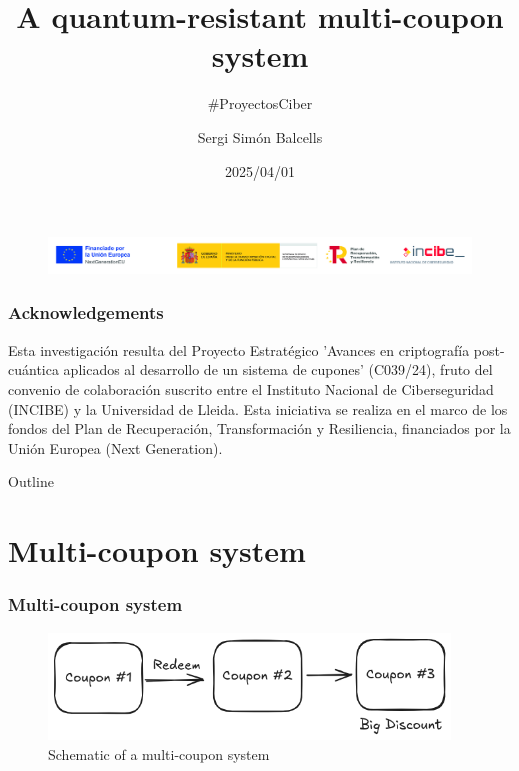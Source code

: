 \documentclass[presentation]{beamer}
\author{Sergi Simón Balcells}
\date{2025/04/01}
\title{A quantum-resistant multi-coupon system}
\subtitle{\#ProyectosCiber}
\newlength\beamerleftmargin
\begin{document}
\begin{frame}
  \titlepage
  \begin{figure}
    \hspace*{-\beamerleftmargin}%
    \includegraphics[width=\paperwidth]{incibe.jpg}
  \end{figure}
\end{frame}

\begin{frame}
  \frametitle{Acknowledgements}
  Esta investigación resulta del Proyecto Estratégico 'Avances
  en criptografía post-cuántica aplicados al desarrollo
  de un sistema de cupones' (C039/24), fruto del convenio
  de colaboración suscrito entre el Instituto Nacional de
  Ciberseguridad (INCIBE) y la Universidad de Lleida. Esta
  iniciativa se realiza en el marco de los fondos del Plan de
  Recuperación, Transformación y Resiliencia, financiados
  por la Unión Europea (Next Generation).
\end{frame}


\begin{frame}{Outline}
  \tableofcontents
\end{frame}

\section{Multi-coupon system}

\begin{frame}
  \frametitle{Multi-coupon system}
  \begin{figure}
    \begin{center}
      \includegraphics[width=0.95\textwidth]{multi-coupon}
    \end{center}
    \caption{Schematic of a multi-coupon system}\label{fig:multi-coupon}
  \end{figure}
\end{frame}
\end{document}
